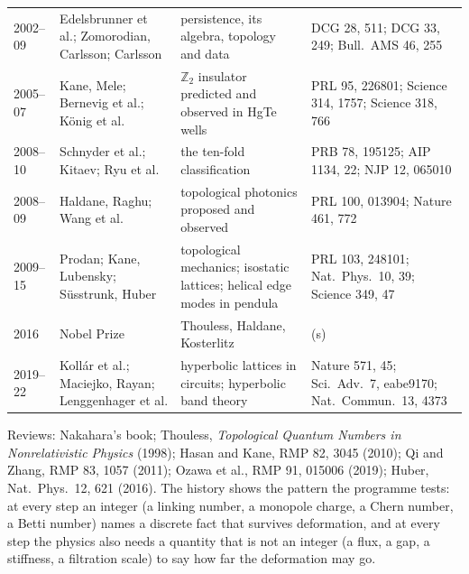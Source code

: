 \documentclass[11pt,a4paper]{article}
\begin{document}
\begin{center}
\begin{longtable}{p{1.3cm}p{3.1cm}p{6.4cm}p{4.2cm}}
2002--09 & Edelsbrunner et al.; Zomorodian, Carlsson; Carlsson & persistence, its algebra, topology and data & DCG 28, 511; DCG 33, 249; Bull.\ AMS 46, 255 \\
2005--07 & Kane, Mele; Bernevig et al.; König et al. & $\mathbb Z_2$ insulator predicted and observed in HgTe wells & PRL 95, 226801; Science 314, 1757; Science 318, 766 \\
2008--10 & Schnyder et al.; Kitaev; Ryu et al. & the ten-fold classification & PRB 78, 195125; AIP 1134, 22; NJP 12, 065010 \\
2008--09 & Haldane, Raghu; Wang et al. & topological photonics proposed and observed & PRL 100, 013904; Nature 461, 772 \\
2009--15 & Prodan; Kane, Lubensky; Süsstrunk, Huber & topological mechanics; isostatic lattices; helical edge modes in pendula & PRL 103, 248101; Nat.\ Phys.\ 10, 39; Science 349, 47 \\
2016 & Nobel Prize & Thouless, Haldane, Kosterlitz & (s) \\
2019--22 & Kollár et al.; Maciejko, Rayan; Lenggenhager et al. & hyperbolic lattices in circuits; hyperbolic band theory & Nature 571, 45; Sci.\ Adv.\ 7, eabe9170; Nat.\ Commun.\ 13, 4373 \\
\bottomrule
\end{longtable}
\end{center}
Reviews: Nakahara's book; Thouless, \emph{Topological Quantum Numbers in Nonrelativistic Physics} (1998); Hasan and Kane, RMP 82, 3045 (2010); Qi and Zhang, RMP 83, 1057 (2011); Ozawa et al., RMP 91, 015006 (2019); Huber, Nat.\ Phys.\ 12, 621 (2016).
The history shows the pattern the programme tests: at every step an integer (a linking number, a monopole charge, a Chern number, a Betti number) names a discrete fact that survives deformation, and at every step the physics also needs a quantity that is not an integer (a flux, a gap, a stiffness, a filtration scale) to say how far the deformation may go.
\end{document}
